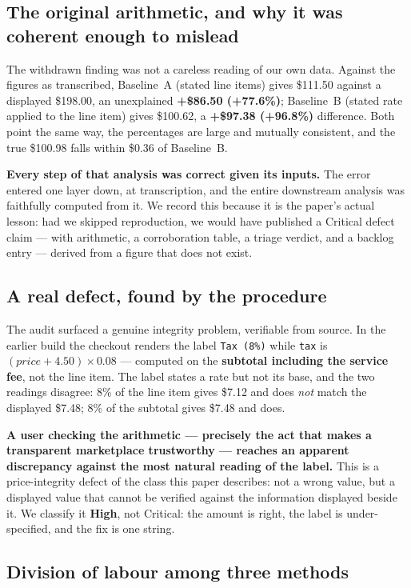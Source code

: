 \documentclass[conference]{IEEEtran}
\begin{document}
\subsection{The original arithmetic, and why it was coherent enough to mislead}

The withdrawn finding was not a careless reading of our own data. Against the figures as transcribed,
Baseline~A (stated line items) gives \$111.50 against a displayed \$198.00, an unexplained
\textbf{+\$86.50 (+77.6\%)}; Baseline~B (stated rate applied to the line item) gives \$100.62, a
\textbf{+\$97.38 (+96.8\%)} difference. Both point the same way, the percentages are large and mutually
consistent, and the true \$100.98 falls within \$0.36 of Baseline~B.

\textbf{Every step of that analysis was correct given its inputs.} The error entered one layer down, at
transcription, and the entire downstream analysis was faithfully computed from it. We record this
because it is the paper's actual lesson: had we skipped reproduction, we would have published a
Critical defect claim --- with arithmetic, a corroboration table, a triage verdict, and a backlog
entry --- derived from a figure that does not exist.

\subsection{A real defect, found by the procedure}

The audit surfaced a genuine integrity problem, verifiable from source. In the earlier build the
checkout renders the label \texttt{Tax (8\%)} while \texttt{tax} is $(price + 4.50) \times 0.08$ ---
computed on the \textbf{subtotal including the service fee}, not the line item. The label states a rate
but not its base, and the two readings disagree: 8\% of the line item gives \$7.12 and does \emph{not}
match the displayed \$7.48; 8\% of the subtotal gives \$7.48 and does.

\textbf{A user checking the arithmetic --- precisely the act that makes a transparent marketplace
trustworthy --- reaches an apparent discrepancy against the most natural reading of the label.} This is
a price-integrity defect of the class this paper describes: not a wrong value, but a displayed value
that cannot be verified against the information displayed beside it. We classify it \textbf{High}, not
Critical: the amount is right, the label is under-specified, and the fix is one string.

\subsection{Division of labour among three methods}
\end{document}
